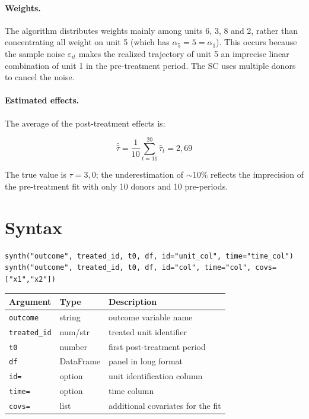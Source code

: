 \paragraph{Weights.}
The algorithm distributes weights mainly among units 6, 3, 8 and
2, rather than concentrating all weight on unit 5 (which has $\alpha_5 = 5 =
\alpha_1$). This occurs because the sample noise $\varepsilon_{it}$ makes the
realized trajectory of unit 5 an imprecise linear combination of unit 1
in the pre-treatment period. The SC uses multiple donors to cancel the noise.

\paragraph{Estimated effects.}
The average of the post-treatment effects is:

\[
  \bar{\hat\tau} = \frac{1}{10}\sum_{t=11}^{20}\hat\tau_t = 2{,}69
\]

The true value is $\tau = 3{,}0$; the underestimation of ${\sim}10\%$ reflects
the imprecision of the pre-treatment fit with only 10 donors and 10 pre-periods.

\section{Syntax}

\begin{lstlisting}
synth("outcome", treated_id, t0, df, id="unit_col", time="time_col")
synth("outcome", treated_id, t0, df, id="col", time="col", covs=["x1","x2"])
\end{lstlisting}

\begin{center}
\begin{tabular}{lll}
\toprule
\textbf{Argument} & \textbf{Type} & \textbf{Description} \\
\midrule
\texttt{outcome}    & string & outcome variable name \\
\texttt{treated\_id}& num/str& treated unit identifier \\
\texttt{t0}         & number & first post-treatment period \\
\texttt{df}         & DataFrame & panel in long format \\
\texttt{id=}        & option & unit identification column \\
\texttt{time=}      & option & time column \\
\texttt{covs=}      & list   & additional covariates for the fit \\
\bottomrule
\end{tabular}
\end{center}

